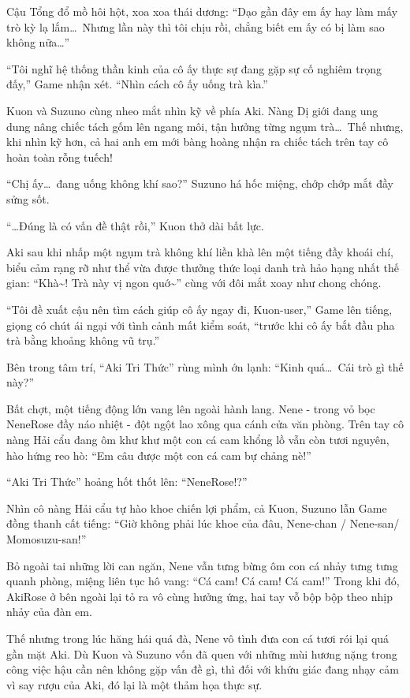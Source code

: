 \documentclass[../main.tex]{subfiles}
\begin{document}
Cậu Tổng đổ mồ hôi hột, xoa xoa thái dương: ``Dạo gần đây em ấy hay làm mấy trò kỳ lạ lắm\dots\ Nhưng lần này thì tôi chịu rồi, chẳng biết em ấy có bị làm sao không nữa\dots''

``Tôi nghĩ hệ thống thần kinh của cô ấy thực sự đang gặp sự cố nghiêm trọng đấy,'' Game nhận xét. ``Nhìn cách cô ấy uống trà kìa.''

Kuon và Suzuno cùng nheo mắt nhìn kỹ về phía Aki. Nàng Dị giới đang ung dung nâng chiếc tách gốm lên ngang môi, tận hưởng từng ngụm trà\dots\ Thế nhưng, khi nhìn kỹ hơn, cả hai anh em mới bàng hoàng nhận ra chiếc tách trên tay cô hoàn toàn rỗng tuếch!

``Chị ấy\dots\ đang uống không khí sao?'' Suzuno há hốc miệng, chớp chớp mắt đầy sửng sốt.

``\dots Đúng là có vấn đề thật rồi,'' Kuon thở dài bất lực.

Aki sau khi nhấp một ngụm trà không khí liền khà lên một tiếng đầy khoái chí, biểu cảm rạng rỡ như thể vừa được thưởng thức loại danh trà hảo hạng nhất thế gian: ``Khà\~{}! Trà này vị ngon quớ\~{}'' cùng với đôi mắt xoay như chong chóng.

``Tôi đề xuất cậu nên tìm cách giúp cô ấy ngay đi, Kuon-user,'' Game  lên tiếng, giọng có chút ái ngại với tình cảnh mất kiểm soát, ``trước khi cô ấy bắt đầu pha trà bằng khoảng không vũ trụ.''

Bên trong tâm trí, ``Aki Tri Thức'' rùng mình ớn lạnh: ``Kinh quá\dots\ Cái trò gì thế này?''

Bất chợt, một tiếng động lớn vang lên ngoài hành lang. Nene - trong vỏ bọc NeneRose đầy náo nhiệt - đột ngột lao xông qua cánh cửa văn phòng. Trên tay cô nàng Hải cẩu đang ôm khư khư một con cá cam khổng lồ vẫn còn tươi nguyên, hào hứng reo hò: ``Em câu được một con cá cam bự chảng nè!''


``Aki Tri Thức'' hoảng hốt thốt lên: ``NeneRose!?''

Nhìn cô nàng Hải cẩu tự hào khoe chiến lợi phẩm, cả Kuon, Suzuno lẫn Game đồng thanh cất tiếng: ``Giờ không phải lúc khoe của đâu, Nene-chan / Nene-san/ Momosuzu-san!''

Bỏ ngoài tai những lời can ngăn, Nene vẫn tưng bừng ôm con cá nhảy tưng tưng quanh phòng, miệng liên tục hô vang: ``Cá cam! Cá cam! Cá cam!'' Trong khi đó, AkiRose ở bên ngoài lại tỏ ra vô cùng hưởng ứng, hai tay vỗ bộp bộp theo nhịp nhảy của đàn em.

Thế nhưng trong lúc hăng hái quá đà, Nene vô tình đưa con cá tươi rói lại quá gần mặt Aki. Dù Kuon và Suzuno vốn đã quen với những mùi hương nặng trong công việc hậu cần nên không gặp vấn đề gì, thì đối với khứu giác đang nhạy cảm vì say rượu của Aki, đó lại là một thảm họa thực sự.
\end{document}
